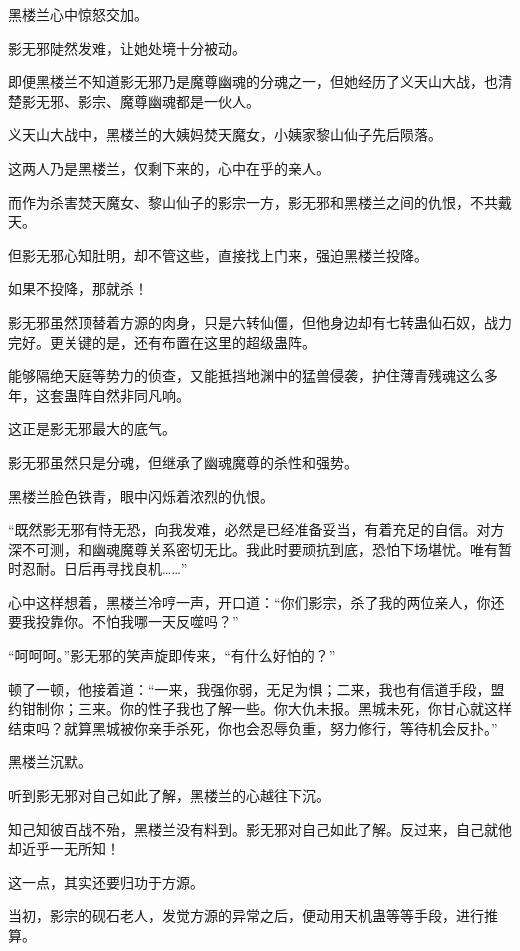 
\begin{this_body}

黑楼兰心中惊怒交加。

影无邪陡然发难，让她处境十分被动。

即便黑楼兰不知道影无邪乃是魔尊幽魂的分魂之一，但她经历了义天山大战，也清楚影无邪、影宗、魔尊幽魂都是一伙人。

义天山大战中，黑楼兰的大姨妈焚天魔女，小姨家黎山仙子先后陨落。

这两人乃是黑楼兰，仅剩下来的，心中在乎的亲人。

而作为杀害焚天魔女、黎山仙子的影宗一方，影无邪和黑楼兰之间的仇恨，不共戴天。

但影无邪心知肚明，却不管这些，直接找上门来，强迫黑楼兰投降。

如果不投降，那就杀！

影无邪虽然顶替着方源的肉身，只是六转仙僵，但他身边却有七转蛊仙石奴，战力完好。更关键的是，还有布置在这里的超级蛊阵。

能够隔绝天庭等势力的侦查，又能抵挡地渊中的猛兽侵袭，护住薄青残魂这么多年，这套蛊阵自然非同凡响。

这正是影无邪最大的底气。

影无邪虽然只是分魂，但继承了幽魂魔尊的杀性和强势。

黑楼兰脸色铁青，眼中闪烁着浓烈的仇恨。

“既然影无邪有恃无恐，向我发难，必然是已经准备妥当，有着充足的自信。对方深不可测，和幽魂魔尊关系密切无比。我此时要顽抗到底，恐怕下场堪忧。唯有暂时忍耐。日后再寻找良机……”

心中这样想着，黑楼兰冷哼一声，开口道：“你们影宗，杀了我的两位亲人，你还要我投靠你。不怕我哪一天反噬吗？”

“呵呵呵。”影无邪的笑声旋即传来，“有什么好怕的？”

顿了一顿，他接着道：“一来，我强你弱，无足为惧；二来，我也有信道手段，盟约钳制你；三来。你的性子我也了解一些。你大仇未报。黑城未死，你甘心就这样结束吗？就算黑城被你亲手杀死，你也会忍辱负重，努力修行，等待机会反扑。”

黑楼兰沉默。

听到影无邪对自己如此了解，黑楼兰的心越往下沉。

知己知彼百战不殆，黑楼兰没有料到。影无邪对自己如此了解。反过来，自己就他却近乎一无所知！

这一点，其实还要归功于方源。

当初，影宗的砚石老人，发觉方源的异常之后，便动用天机蛊等等手段，进行推算。


\end{this_body}
